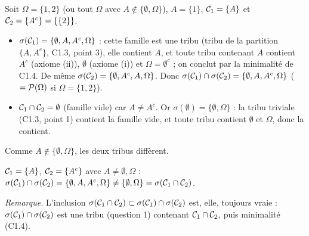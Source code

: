 \documentclass[11pt,a4paper]{article}
\begin{document}
\begin{exo}
Soit $\Omega=\{1,2\}$ (ou tout $\Omega$ avec $A\notin\{\emptyset,\Omega\}$), $A=\{1\}$, $\mathcal{C}_1=\{A\}$ et $\mathcal{C}_2=\{A^c\}=\{\{2\}\}$.
\begin{itemize}
  \item $\sigma(\mathcal{C}_1)=\{\emptyset,A,A^c,\Omega\}$ : cette famille est une tribu (tribu de la partition $\{A,A^c\}$, C1.3, point 3),
  elle contient $A$, et toute tribu contenant $A$ contient $A^c$ (axiome (ii)), $\emptyset$ (axiome (i)) et $\Omega=\emptyset^c$ ;
  on conclut par la minimalité de C1.4. De même $\sigma(\mathcal{C}_2)=\{\emptyset,A^c,A,\Omega\}$. Donc
  $\sigma(\mathcal{C}_1)\cap\sigma(\mathcal{C}_2)=\{\emptyset,A,A^c,\Omega\}$ ($=\mathcal{P}(\Omega)$ si $\Omega=\{1,2\}$).
  \item $\mathcal{C}_1\cap\mathcal{C}_2=\emptyset$ (famille vide) car $A\neq A^c$. Or $\sigma(\emptyset)=\{\emptyset,\Omega\}$ :
  la tribu triviale (C1.3, point 1) contient la famille vide, et toute tribu contient $\emptyset$ et $\Omega$, donc la contient.
\end{itemize}
Comme $A\notin\{\emptyset,\Omega\}$, les deux tribus diffèrent.
\begin{resultat}
$\mathcal{C}_1=\{A\}$, $\mathcal{C}_2=\{A^c\}$ avec $A\neq\emptyset,\Omega$ :
$\sigma(\mathcal{C}_1)\cap\sigma(\mathcal{C}_2)=\{\emptyset,A,A^c,\Omega\}\neq\{\emptyset,\Omega\}=\sigma(\mathcal{C}_1\cap\mathcal{C}_2)$.
\end{resultat}
\textit{Remarque.} L'inclusion $\sigma(\mathcal{C}_1\cap\mathcal{C}_2)\subset\sigma(\mathcal{C}_1)\cap\sigma(\mathcal{C}_2)$ est, elle, toujours vraie :
$\sigma(\mathcal{C}_1)\cap\sigma(\mathcal{C}_2)$ est une tribu (question 1) contenant $\mathcal{C}_1\cap\mathcal{C}_2$, puis minimalité (C1.4).
\end{exo}
\end{document}

